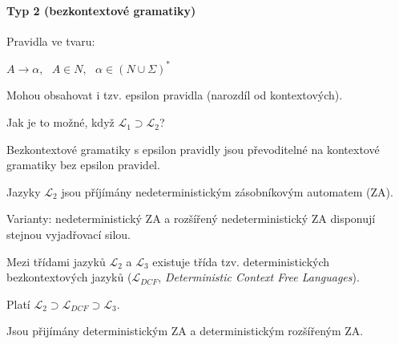 \paragraph*{Typ 2 (bezkontextové gramatiky)} \begin{compactitem}
    \item Pravidla ve tvaru: \begin{compactitem}
        \item $A \rightarrow \alpha,~~~ A \in N,~~~ \alpha \in (N \cup \Sigma)^*$
        \item Mohou obsahovat i tzv. epsilon pravidla (narozdíl od kontextových).
        \item Jak je to možné, když $\mathcal{L}_1 \supset \mathcal{L}_2$?
        \item Bezkontextové gramatiky s epsilon pravidly jsou převoditelné na kontextové gramatiky bez epsilon pravidel.
    \end{compactitem}

    \item Jazyky $\mathcal{L}_2$ jsou příjímány nedeterministickým zásobníkovým automatem (ZA). \begin{compactitem}
        \item Varianty: nedeterministický ZA a rozšířený nedeterministický ZA disponují stejnou vyjadřovací silou.
    \end{compactitem}

    \item Mezi třídami jazyků $\mathcal{L}_2$ a $\mathcal{L}_3$ existuje třída tzv. deterministických bezkontextových jazyků ($\mathcal{L}_{DCF}$, \textit{Deterministic Context Free Languages}). \begin{compactitem}
        \item Platí $\mathcal{L}_2 \supset \mathcal{L}_{DCF} \supset \mathcal{L}_3$.
        \item Jsou přijímány deterministickým ZA a deterministickým rozšířeným ZA. 
    \end{compactitem}
\end{compactitem}

